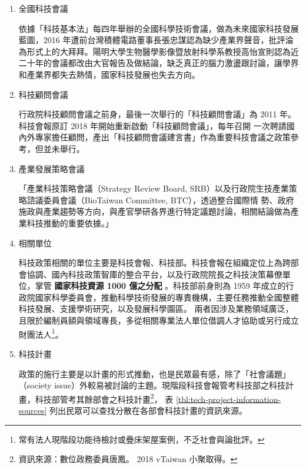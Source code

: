 \documentclass[12pt,a4paper]{article}
\begin{document}
\begin{enumerate}
\item 全國科技會議
\label{sec:orgf30d5e5}

依據「科技基本法」每四年舉辦的全國科學技術會議，做為未來國家科技發展藍圖，2016 年遭前台灣積體電路董事長張忠謀認為缺少產業界聲音，批評淪為形式上的大拜拜。陽明大學生物醫學影像暨放射科學系教授高怡宣則認為近二十年的會議都改由大官報告及做結論，缺乏真正的腦力激盪跟討論，讓學界和產業界都失去熱情，國家科技發展也失去方向。
\item 科技顧問會議
\label{sec:org1b6ec88}

行政院科技顧問會議之前身，最後一次舉行的「科技顧問會議」為 2011 年。科技會報原訂 2018 年開始重新啟動「科技顧問會議」，每年召開 一次聘請國內外專家擔任顧問，產出「科技顧問會議建言書」作為重要科技會議之政策參考，但並未舉行。
\item 產業發展策略會議
\label{sec:orgddb7321}

「產業科技策略會議（Strategy Review Board, SRB）以及行政院生技產業策略諮議委員會議（BioTaiwan Committee, BTC），透過整合國際情
勢、政府施政與產業趨勢等方向，與產官學研各界進行特定議題討論，相關結論做為產業科技推動的重要依據。」\citep{guo17}
\item 相關單位
\label{sec:orgb56e589}

科技政策相關的單位主要是科技會報、科技部。科技會報在組織定位上為跨部會協調、國內科技政策智庫的整合平台，以及行政院院長之科技決策幕僚單位，掌管 \textbf{國家科技資源 1000 億之分配} 。科技部前身則為 1959 年成立的行政院國家科學委員會，推動科學技術發展的專責機構，主要任務推動全國整體科技發展、支援學術研究，以及發展科學園區。
兩者因涉及業務領域廣泛，且限於編制員額與領域專長，多從相關專業法人單位借調人才協助或另行成立財團法人\footnote{常有法人現階段功能待檢討或疊床架屋案例，不乏社會與論批評。}。
\item 科技計畫
\label{sec:orgbb22668}

政策的施行主要是以計畫的形式推動，也是民眾最有感，除了「社會議題」（society issue）外較易被討論的主題。現階段科技會報管考科技部之科技計畫，科技部管考其餘部會之科技計畫\footnote{資訊來源：數位政務委員唐鳳。 2018 vTaiwan 小聚取得。}， 表 \ref{tbl:tech-project-information-sources} 列出民眾可以查找分散在各部會科技計畫的資訊來源。


\end{enumerate}
\end{document}
